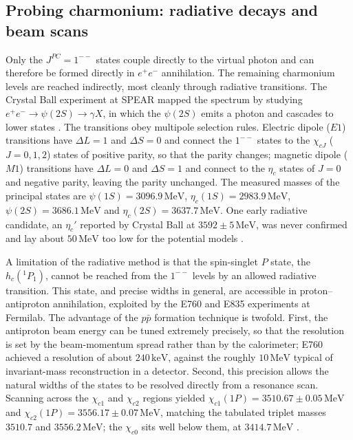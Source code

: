 \FloatBarrier

\subsection{Probing charmonium: radiative decays and beam scans}
\label{subsec:charmonium-probes}

Only the $J^{PC} = 1^{--}$ states couple directly to the virtual photon and can therefore be
formed directly in $e^+e^-$ annihilation. The remaining charmonium levels are reached
indirectly, most cleanly through radiative transitions. The Crystal Ball experiment at SPEAR
mapped the spectrum by studying $e^+e^- \to \psi(2S) \to \gamma X$, in which the $\psi(2S)$
emits a photon and cascades to lower states \cite[Ch.~9]{Amsler2018}. The transitions obey
multipole selection rules. Electric dipole ($E1$) transitions have $\Delta L = 1$ and
$\Delta S = 0$ and connect the $1^{--}$ states to the $\chi_{cJ}$ ($J = 0, 1, 2$) states of
positive parity, so that the parity changes; magnetic dipole ($M1$) transitions have
$\Delta L = 0$ and $\Delta S = 1$ and connect to the $\eta_c$ states of $J = 0$ and negative
parity, leaving the parity unchanged. The measured masses of the principal states are
$\psi(1S) = 3096.9\,\mathrm{MeV}$, $\eta_c(1S) = 2983.9\,\mathrm{MeV}$,
$\psi(2S) = 3686.1\,\mathrm{MeV}$ and $\eta_c(2S) = 3637.7\,\mathrm{MeV}$. One early
radiative candidate, an $\eta_c'$ reported by Crystal Ball at $3592 \pm 5\,\mathrm{MeV}$,
was never confirmed and lay about $50\,\mathrm{MeV}$ too low for the potential models
\cite[Ch.~9]{Amsler2018}.

A limitation of the radiative method is that the spin-singlet $P$ state, the $h_c({}^1P_1)$,
cannot be reached from the $1^{--}$ levels by an allowed radiative transition. This state,
and precise widths in general, are accessible in proton--antiproton annihilation, exploited
by the E760 and E835 experiments at Fermilab. The advantage of the $p\bar p$ formation
technique is twofold. First, the antiproton beam energy can be tuned extremely precisely, so
that the resolution is set by the beam-momentum spread rather than by the calorimeter; E760
achieved a resolution of about $240\,\mathrm{keV}$, against the roughly $10\,\mathrm{MeV}$
typical of invariant-mass reconstruction in a detector. Second, this precision allows the
natural widths of the states to be resolved directly from a resonance scan. Scanning across
the $\chi_{c1}$ and $\chi_{c2}$ regions yielded
$\chi_{c1}(1P) = 3510.67 \pm 0.05\,\mathrm{MeV}$ and
$\chi_{c2}(1P) = 3556.17 \pm 0.07\,\mathrm{MeV}$, matching the tabulated triplet masses
$3510.7$ and $3556.2\,\mathrm{MeV}$; the $\chi_{c0}$ sits well below them, at
$3414.7\,\mathrm{MeV}$ \cite[Ch.~9]{Amsler2018}.

